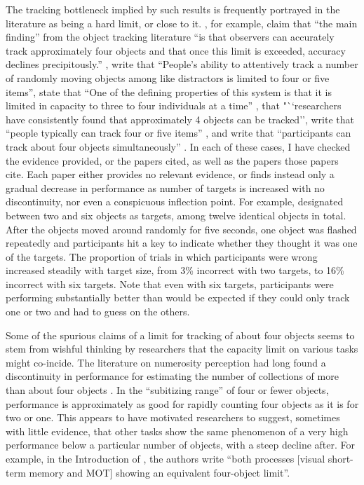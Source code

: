 \documentclass[]{book}
\begin{document}
The tracking bottleneck implied by such results is frequently portrayed in the literature as being a hard limit, or close to it. \citet{doranRoleVisualAttention2010}, for example, claim that ``the main finding'' from the object tracking literature ``is that observers can accurately track approximately four objects and that once this limit is exceeded, accuracy declines precipitously.'' , \citet{fougnieDistinctCapacityLimits2006} write that ``People's ability to attentively track a number of randomly moving objects among like distractors is limited to four or five items'', \citet{piazzaNeurocognitiveStartupTools2011} state that ``One of the defining properties of this system is that it is limited in capacity to three to four individuals at a time'' , \citet{alvarezHowManyObjects2007} that "``researchers have consistently found that approximately 4 objects can be tracked'', \citet{chesneyEvidenceSharedMechanism2011} write that ``people typically can track four or five items'' , and \citet{vanderburgChangesNotDifferences2019} write that ``participants can track about four objects simultaneously'' . In each of these cases, I have checked the evidence provided, or the papers cited, as well as the papers those papers cite. Each paper either provides no relevant evidence, or finds instead only a gradual decrease in performance as number of targets is increased with no discontinuity, nor even a conspicuous inflection point. For example, \citet{oksamaMultipleObjectTracking2004} designated between two and six objects as targets, among twelve identical objects in total. After the objects moved around randomly for five seconds, one object was flashed repeatedly and participants hit a key to indicate whether they thought it was one of the targets. The proportion of trials in which participants were wrong increased steadily with target size, from 3\% incorrect with two targets, to 16\% incorrect with six targets. Note that even with six targets, participants were performing substantially better than would be expected if they could only track one or two and had to guess on the others.

Some of the spurious claims of a limit for tracking of about four objects seems to stem from wishful thinking by researchers that the capacity limit on various tasks might co-incide. The literature on numerosity perception had long found a discontinuity in performance for estimating the number of collections of more than about four objects \citep{jevonsPowerNumericalDiscrimination1871, revkinDoesSubitizingReflect2008}. In the ``subitizing range'' of four or fewer objects, performance is approximately as good for rapidly counting four objects as it is for two or one. This appears to have motivated researchers to suggest, sometimes with little evidence, that other tasks show the same phenomenon of a very high performance below a particular number of objects, with a steep decline after. For example, in the Introduction of \citet{bettencourtSharedFilteringProcesses2011}, the authors write ``both processes {[}visual short-term memory and MOT{]} showing an equivalent four-object limit''.
\end{document}
